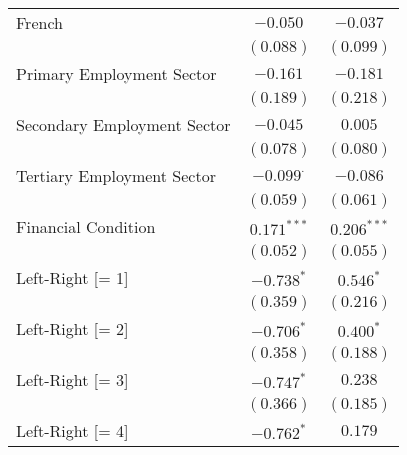\begin{center}
\begin{tiny}
\begin{longtable}{l@{} c@{} c@{}}
\quad French                                                               & $-0.050$         & $-0.037$         \\
                                                                           & $(0.088)$        & $(0.099)$        \\
\quad Primary Employment Sector                                            & $-0.161$         & $-0.181$         \\
                                                                           & $(0.189)$        & $(0.218)$        \\
\quad Secondary Employment Sector                                          & $-0.045$         & $0.005$          \\
                                                                           & $(0.078)$        & $(0.080)$        \\
\quad Tertiary Employment Sector                                           & $-0.099^{\cdot}$ & $-0.086$         \\
                                                                           & $(0.059)$        & $(0.061)$        \\
\quad Financial Condition                                                  & $0.171^{***}$    & $0.206^{***}$    \\
                                                                           & $(0.052)$        & $(0.055)$        \\
\quad Left-Right [= 1]                                                     & $-0.738^{*}$     & $0.546^{*}$      \\
                                                                           & $(0.359)$        & $(0.216)$        \\
\quad Left-Right [= 2]                                                     & $-0.706^{*}$     & $0.400^{*}$      \\
                                                                           & $(0.358)$        & $(0.188)$        \\
\quad Left-Right [= 3]                                                     & $-0.747^{*}$     & $0.238$          \\
                                                                           & $(0.366)$        & $(0.185)$        \\
\quad Left-Right [= 4]                                                     & $-0.762^{*}$     & $0.179$          \\

\end{longtable}
\end{tiny}
\end{center}
